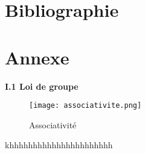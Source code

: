 \documentclass[a4paper]{article}
\begin{document}
\newpage
\section{Bibliographie} 


\nocite{ref11}
\nocite{ref16}
\nocite{ref21}
\nocite{ref27}
\newpage
\section{Annexe}
\textbf{I.1 Loi de groupe}
\begin{figure}[!h]
\centering
\texttt{[image: associativite.png]}
\caption{Associativité}
\label{neutre}
\end{figure}
\newpage
khhhhhhhhhhhhhhhhhhhhhh
\end{document}
